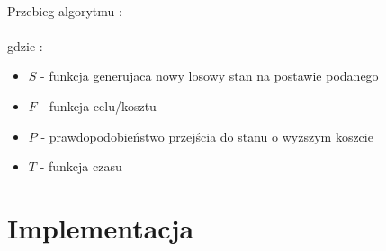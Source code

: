 \documentclass[wide,a4paper,titlepage,12pt] {article}
\begin{document}
\paragraph{}
Przebieg algorytmu :
\lstset{ %
    language=c++,                %
    basicstyle=\scriptsize,       %
    numbers=left,                   %
    numberstyle=\scriptsize,      %
    stepnumber=10,                   %
    numbersep=9pt,                  %
    showspaces=false,               %
    showstringspaces=false,         %
    showtabs=false,                 %
    breaklines=true,                %
    }
    
\paragraph{}
gdzie :
\begin{itemize}
  \item $S$ - funkcja generujaca nowy losowy stan na postawie podanego
  \item $F$ - funkcja celu/kosztu
  \item $P$ - prawdopodobieństwo przejścia do stanu o wyższym koszcie
  \item $T$ - funkcja czasu
\end{itemize}
\section{Implementacja}
\end{document}
